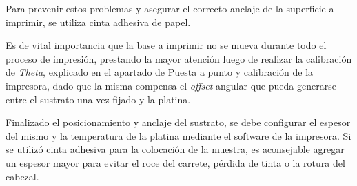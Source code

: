 Para prevenir estos problemas y asegurar el correcto anclaje de la superficie a imprimir, se utiliza cinta adhesiva de papel.

Es de vital importancia que la base a imprimir no se mueva durante todo el proceso de impresión, prestando la mayor atención luego de realizar la calibración de \textit{Theta}, explicado en el apartado de Puesta a punto y calibración de la impresora, dado que la misma compensa el \textit{offset} angular que pueda generarse entre el sustrato una vez fijado y la platina.

Finalizado el posicionamiento y anclaje del sustrato, se debe configurar el espesor del mismo y la temperatura de la platina mediante el software de la impresora. Si se utilizó cinta adhesiva para la colocación de la muestra, es aconsejable agregar un espesor mayor para evitar el roce del carrete, pérdida de tinta o la rotura del cabezal.